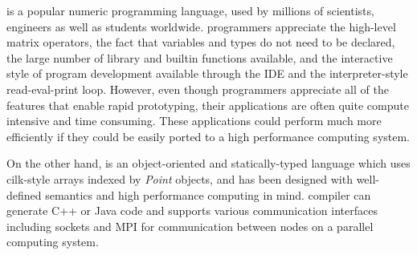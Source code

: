 \matlab is a popular numeric programming language, used by millions of
scientists, engineers as well as students worldwide\cite{MatlabGrowth}.  \matlab
programmers appreciate the high-level matrix operators,  the fact that
variables and types do not need to be declared, the large number of library and
builtin functions available, and the interactive style of program development
available through the IDE and the interpreter-style read-eval-print loop.
However, even though \matlab programmers appreciate all of the features that
enable rapid prototyping,  their applications are often quite compute intensive
and time consuming. These applications could perform much more efficiently if
they could be easily ported to a high performance computing system.  

On the other hand, \xten is an object-oriented and statically-typed language
which uses cilk-style arrays indexed by \emph{Point} objects, and has been
designed with well-defined semantics and high performance computing in mind.
\xten compiler can generate C++ or Java code and supports various communication
interfaces including sockets and MPI for communication between nodes on a
parallel computing system.

